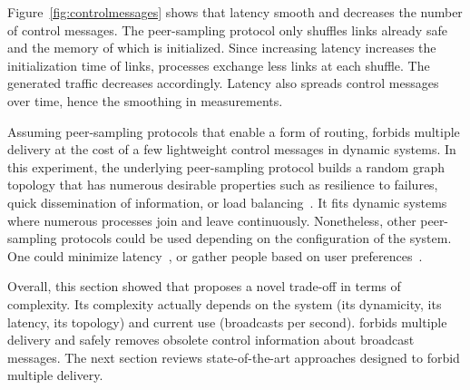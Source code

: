 \noindent Figure~\ref{fig:controlmessages} shows that latency smooth and
decreases the number of control messages. The peer-sampling protocol only
shuffles links already safe and the memory of which is initialized. Since
increasing latency increases the initialization time of links, processes
exchange less links at each shuffle. The generated traffic decreases
accordingly. Latency also spreads control messages over time, hence the
smoothing in measurements.

\noindent Assuming peer-sampling protocols that enable a form of routing,
\RPCBROADCAST forbids multiple delivery at the cost of a few lightweight control
messages in dynamic systems. In this experiment, the underlying peer-sampling
protocol builds a random graph topology that has numerous desirable properties
such as resilience to failures, quick dissemination of information, or load
balancing~\cite{jelasity2007gossip}. It fits dynamic systems where numerous
processes join and leave continuously. Nonetheless, other peer-sampling
protocols could be used depending on the configuration of the system.  One could
minimize latency~\cite{dabek2004vivaldi}, or gather people based on user
preferences~\cite{jelasity2009tman}.

Overall, this section showed that \RPCBROADCAST proposes a novel trade-off in
terms of complexity. Its complexity actually depends on the system (its
dynamicity, its latency, its topology) and current use (broadcasts per second).
\RPCBROADCAST forbids multiple delivery and safely removes obsolete control
information about broadcast messages. The next section reviews state-of-the-art
approaches designed to forbid multiple delivery.

